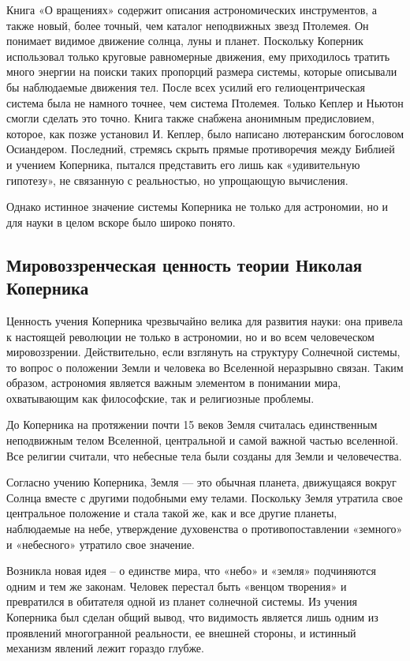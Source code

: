 \documentclass[a4paper, 14pt]{extreport}
\begin{document}
Книга «О вращениях» содержит описания астрономических инструментов, а
также новый, более точный, чем каталог неподвижных звезд Птолемея. Он
понимает видимое движение солнца, луны и планет. Поскольку Коперник
использовал только круговые равномерные движения, ему приходилось
тратить много энергии на поиски таких пропорций размера системы, которые
описывали бы наблюдаемые движения тел. После всех усилий его
гелиоцентрическая система была не намного точнее, чем система Птолемея.
Только Кеплер и Ньютон смогли сделать это точно. Книга также снабжена
анонимным предисловием, которое, как позже установил И. Кеплер, было
написано лютеранским богословом Осиандером. Последний, стремясь скрыть
прямые противоречия между Библией и учением Коперника, пытался
представить его лишь как «удивительную гипотезу», не связанную с
реальностью, но упрощающую вычисления.

Однако истинное значение системы Коперника не только для астрономии, но
и для науки в целом вскоре было широко понято.

\subsection{Мировоззренческая ценность теории Николая Коперника}

Ценность учения Коперника чрезвычайно велика для развития науки: она
привела к настоящей революции не только в астрономии, но и во всем
человеческом мировоззрении. Действительно, если взглянуть на структуру
Солнечной системы, то вопрос о положении Земли и человека во Вселенной
неразрывно связан. Таким образом, астрономия является важным элементом в
понимании мира, охватывающим как философские, так и религиозные
проблемы.

До Коперника на протяжении почти 15 веков Земля считалась единственным
неподвижным телом Вселенной, центральной и самой важной частью
вселенной. Все религии считали, что небесные тела были созданы для Земли
и человечества.

Согласно учению Коперника, Земля --- \hspace{0pt}\hspace{0pt}это обычная
планета, движущаяся вокруг Солнца вместе с другими подобными ему телами.
Поскольку Земля утратила свое центральное положение и стала такой же,
как и все другие планеты, наблюдаемые на небе, утверждение духовенства о
противопоставлении «земного» и «небесного» утратило свое значение.

Возникла новая идея -- о единстве мира, что «небо» и «земля» подчиняются
одним и тем же законам. Человек перестал быть «венцом творения» и
превратился в обитателя одной из планет солнечной системы. Из учения
Коперника был сделан общий вывод, что видимость является лишь одним из
проявлений многогранной реальности, ее внешней стороны, и истинный
механизм явлений лежит гораздо глубже.
\end{document}
